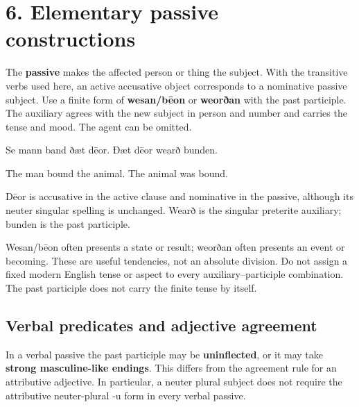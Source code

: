 \section*{6. Elementary passive constructions}

The \textbf{passive} makes the affected person or thing the subject. With the transitive verbs used here, an active accusative object corresponds to a nominative passive subject. Use a finite form of \textbf{wesan/\allowbreak{}bēon} or \textbf{weorðan} with the past participle. The auxiliary agrees with the new subject in person and number and carries the tense and mood. The agent can be omitted.

Se mann band ðæt dēor. Ðæt dēor wearð bunden.

The man bound the animal. The animal was bound.

Dēor is accusative in the active clause and nominative in the passive, although its neuter singular spelling is unchanged. Wearð is the singular preterite auxiliary; bunden is the past participle.

Wesan/\allowbreak{}bēon often presents a state or result; weorðan often presents an event or becoming. These are useful tendencies, not an absolute division. Do not assign a fixed modern English tense or aspect to every auxiliary–participle combination. The past participle does not carry the finite tense by itself.

\subsection*{Verbal predicates and adjective agreement}

In a verbal passive the past participle may be \textbf{uninflected}, or it may take \textbf{strong masculine-like endings}. This differs from the agreement rule for an attributive adjective. In particular, a neuter plural subject does not require the attributive neuter-plural -u form in every verbal passive.

